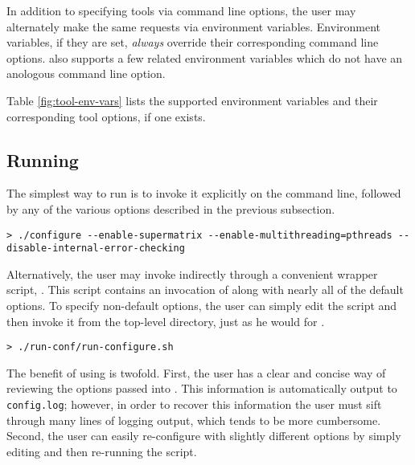 In addition to specifying tools via command line options, the user may
alternately make the same requests via environment variables.
Environment variables, if they are set, {\em always} override their
corresponding command line options.
\configure also supports a few related environment variables which do
not have an anologous command line option.



Table \ref{fig:tool-env-vars} lists the supported
environment variables and their corresponding tool options, if one
exists.

\subsection{Running \configure}
\label{sec:running-configure}


The simplest way to run \configure is to invoke it explicitly on the
command line, followed by any of the various options described in the
previous subsection.

\begin{Verbatim}[frame=single,framesep=2.5mm,xleftmargin=5mm,commandchars=\\\{\},fontsize=\footnotesize]
> ./configure --enable-supermatrix --enable-multithreading=pthreads --disable-internal-error-checking
\end{Verbatim}

\noindent
Alternatively, the user may invoke \configure indirectly through a convenient
wrapper script, \runconfigurens.
This script contains an invocation of \configure along with nearly all of
the default \configure options.
To specify non-default options, the user can simply edit the script and
then invoke it from the top-level directory, just as he would for
\configurens.

\begin{Verbatim}[frame=single,framesep=2.5mm,xleftmargin=5mm,commandchars=\\\{\},fontsize=\footnotesize]
> ./run-conf/run-configure.sh
\end{Verbatim}

\noindent
The benefit of using \runconfigure is twofold.
First, the user has a clear and concise way of reviewing the options passed
into \configurens.
This information is automatically output to {\tt config.log}; however, in
order to recover this information the user must sift through many lines of
logging output, which tends to be more cumbersome.
Second, the user can easily re-configure \libflame with slightly different
options by simply editing \runconfigure and then re-running the script.


